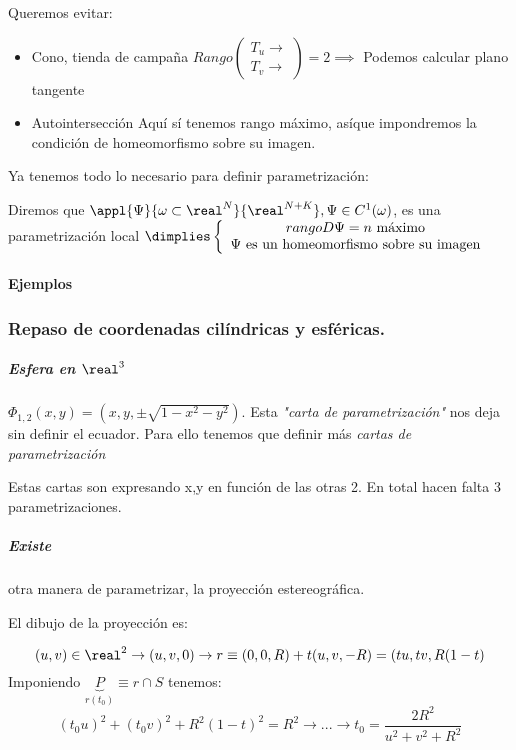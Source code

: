 Queremos evitar:

\begin{itemize}
\item Cono, tienda de campaña
$Rango \begin{pmatrix}
T_u \rightarrow\\
T_v \rightarrow
\end{pmatrix} = 2 \implies $ Podemos calcular plano tangente
\item Autointersección
Aquí sí tenemos rango máximo, asíque impondremos la condición de homeomorfismo sobre su imagen.
\end{itemize}

Ya tenemos todo lo necesario para definir parametrización:

\begin{defn}
Diremos que $\appl{\Psi}{\omega \subset \real^N}{\real^{N+K}}, \Psi \in C^1(\omega)$, es una parametrización local $\dimplies \left\{ \begin{array}{c}
 rango D\Psi = n \text{ máximo}\\
 \Psi \text{ es un homeomorfismo sobre su imagen}
\end{array}\right.$
\end{defn}



\paragraph{Ejemplos}
\subsubsection{Repaso de coordenadas cilíndricas y esféricas.}

\subparagraph{Esfera en $\real^3$}
 $\Phi_{1,2}(x,y) = (x,y,\pm \sqrt{1-x^2-y^2})$. Esta \emph{"carta de parametrización"} nos deja sin definir el ecuador. Para ello tenemos que definir más \emph{cartas de parametrización} 
 
 Estas cartas son expresando x,y en función de las otras 2. En total hacen falta 3 parametrizaciones.
 
 \subparagraph{Existe} otra manera de parametrizar, la proyección estereográfica.  

El dibujo de la proyección es:

 
 
 \[(u,v) \in \real^2 \rightarrow (u,v,0) \rightarrow r\equiv (0,0,R) + t(u,v,-R) = (tu,tv,R(1-t)\]
 Imponiendo $\underbrace{P}_{r(t_0)} \equiv r\cap S$ tenemos: \[(t_0u)^2+(t_0v)^2 + R^2(1-t)^2 = R^2 \rightarrow ... \rightarrow t_0 = \frac{2R^2}{u^2+v^2+R^2}\]
 
